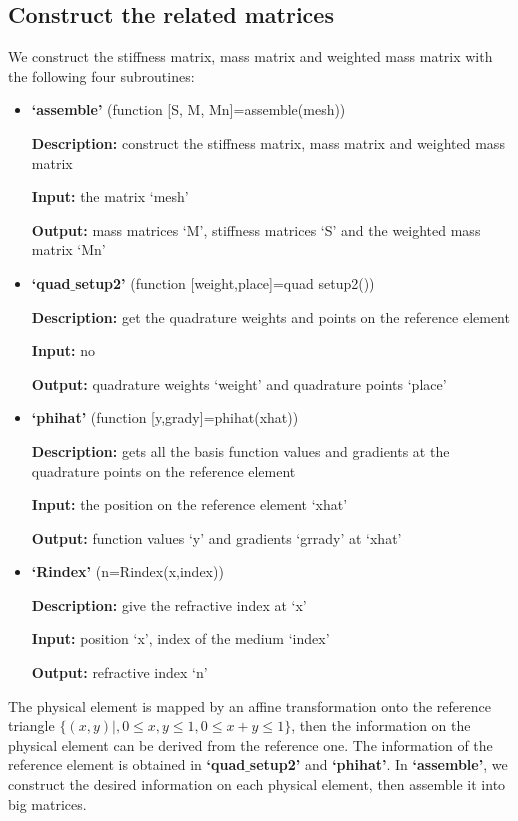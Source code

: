\documentclass[12pt]{article}%
\numberwithin{equation}{section}
\numberwithin{remark}{section}
\numberwithin{example}{section}
\begin{document}
\subsection{Construct the related matrices }
 We construct the stiffness matrix, mass matrix and weighted mass matrix
with the following four subroutines:
\begin{itemize}
\item \textbf{`assemble'} (function [S, M, Mn]=assemble(mesh))

\textbf{Description:} construct the stiffness matrix, mass matrix and weighted
mass matrix

\textbf{Input:} the matrix `mesh'

\textbf{Output:} mass matrices `M', stiffness matrices `S' and the weighted
mass matrix `Mn'

\item \textbf{`quad}$\_$\textbf{setup2'}  (function [weight,place]=quad setup2())

\textbf{Description:} get the quadrature weights and points on the reference
element

\textbf{Input:} no

\textbf{Output:} quadrature weights `weight' and quadrature points `place'

\item \textbf{`phihat'} (function [y,grady]=phihat(xhat))

\textbf{Description:} gets all the basis function values and gradients at the
quadrature points on the reference element

\textbf{Input:} the position on the reference element `xhat'

\textbf{Output:} function values `y' and gradients `grrady' at `xhat'

\item \textbf{`Rindex'} (n=Rindex(x,index))

\textbf{Description:} give the refractive index at `x'

\textbf{Input:} position `x', index of the medium `index'

\textbf{Output:} refractive index `n'
\end{itemize}

The physical element is mapped by an affine transformation onto the reference
triangle $\{(x, y)|, 0\leq x, y \leq 1, 0 \leq x + y  \leq1\}$, then the information
on the physical element can be derived from the reference one. The information
of the reference element is obtained in \textbf{`quad}$\_$\textbf{setup2'}  and \textbf{`phihat'}. In
\textbf{`assemble'}, we construct the desired information on each physical element,
then assemble it into big matrices.
\end{document}
